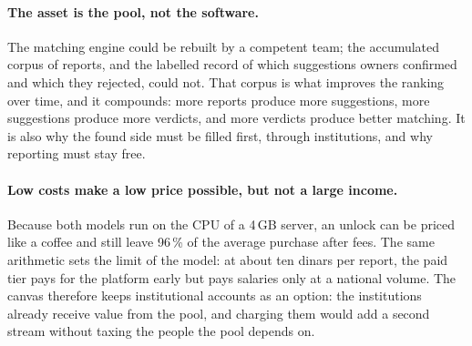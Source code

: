 \paragraph{The asset is the pool, not the software.} The matching engine could
be rebuilt by a competent team; the accumulated corpus of reports, and the
labelled record of which suggestions owners confirmed and which they rejected,
could not. That corpus is what improves the ranking over time, and it compounds:
more reports produce more suggestions, more suggestions produce more verdicts,
and more verdicts produce better matching. It is also why the found side must be
filled first, through institutions, and why reporting must stay free.

\paragraph{Low costs make a low price possible, but not a large income.} Because
both models run on the CPU of a 4\,GB server, an unlock can be priced like a
coffee and still leave 96\,\% of the average purchase after fees. The same
arithmetic sets the limit of the model: at about ten dinars per report, the
paid tier pays for the platform early but pays salaries only at a national
volume. The canvas therefore keeps institutional accounts as an option: the
institutions already receive value from the pool, and charging them would add a
second stream without taxing the people the pool depends on.
